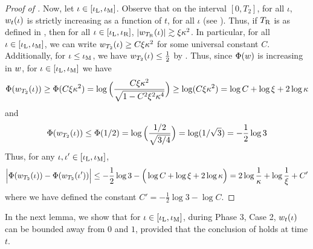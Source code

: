 \begin{proof}[Proof of ]
Now, let $\iota \in [\iota_{\textup{L}}, \iota_{\textup{M}}]$. Observe that on the interval $[0, T_2]$, for all $\iota$, $w_t(\iota)$ is strictly increasing as a function of $t$, for all $\iota$ (see ). Thus, if ${T_{\textup{R}}}$ is as defined in , then for all $\iota \in [\iota_{\textup{L}}, \iota_{\textup{R}}]$, $|w_{{T_{\textup{R}}}}(\iota)| \gtrsim \xi \kappa^2$. In particular, for all $\iota \in [\iota_{\textup{L}}, \iota_{\textup{M}}]$, we can write $w_{T_2}(\iota) \geq C \xi \kappa^2$ for some universal constant $C$. Additionally, for $\iota \leq \iota_{\textup{M}}$, we have $w_{T_2}(\iota) \leq \frac{1}{2}$ by . Thus, since $\Phi(w)$ is increasing in $w$, for $\iota \in [\iota_{\textup{L}}, \iota_{\textup{M}}]$ we have
\begin{align}
\Phi(w_{T_2}(\iota))
 \geq \Phi(C \xi \kappa^2) 
 = \log\Big(\frac{C \xi \kappa^2}{\sqrt{1 - C^2 \xi^2 \kappa^4}}\Big) 
 \geq \log (C \xi \kappa^2) 
 = \log C + \log \xi + 2 \log \kappa
\end{align}
and
\begin{align}
\Phi(w_{T_2}(\iota))
 \leq \Phi(1/2) 
 = \log\Big(\frac{1/2}{\sqrt{3/4}}\Big) 
 = \log(1/\sqrt{3}) 
 = -\frac{1}{2} \log 3
\end{align}
Thus, for any $\iota, \iota' \in [\iota_{\textup{L}}, \iota_{\textup{M}}]$,
\begin{align}
\Big|\Phi(w_{T_2}(\iota)) - \Phi(w_{T_2}(\iota'))\Big|
 \leq -\frac{1}{2} \log 3 - \Big(\log C + \log \xi + 2 \log \kappa\Big) 
 = 2 \log \frac{1}{\kappa} + \log \frac{1}{\xi} + C'
\end{align}
where we have defined the constant $C' = -\frac{1}{2} \log 3 - \log C$.
\end{proof}

In the next lemma, we show that for $\iota \in [\iota_{\textup{L}}, \iota_{\textup{M}}]$, during Phase 3, Case 2, $w_t(\iota)$ can be bounded away from $0$ and $1$, provided that the conclusion of  holds at time $t$.

